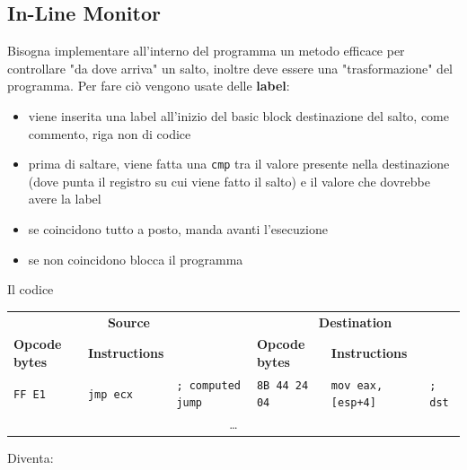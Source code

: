 \newpage

\subsection{In-Line Monitor}

Bisogna implementare all'interno del programma un metodo efficace per controllare "da dove arriva" un salto, inoltre deve essere una "trasformazione" del programma. Per fare ciò vengono usate delle \textbf{label}:
\begin{itemize}
	\item viene inserita una label all'inizio del basic block destinazione del salto, come commento, riga non di codice
	\item prima di saltare, viene fatta una \texttt{cmp} tra il valore presente nella destinazione (dove punta il registro su cui viene fatto il salto) e il valore che dovrebbe avere la label
	\item se coincidono tutto a posto, manda avanti l'esecuzione
	\item se non coincidono blocca il programma
\end{itemize} 

Il codice
\begin{table}[h]
	\centering
	\begin{adjustbox}{max width=\textwidth}
	\begin{tabular}{@{} lll | lll @{}}
		\multicolumn{3}{c}{\bfseries Source} & \multicolumn{3}{c}{\bfseries Destination} \\
		\cmidrule(lr){1-3} \cmidrule(l){4-6}
		\bfseries Opcode bytes & \bfseries Instructions &
		& \bfseries Opcode bytes & \bfseries Instructions & \\
		\midrule
		\texttt{FF E1} & \texttt{jmp ecx} & \texttt{; computed jump}
		& \texttt{8B 44 24 04} & \texttt{mov eax, [esp+4]} & \texttt{; dst} \\
		\multicolumn{6}{c}{\dots} \\
	\end{tabular}
	\end{adjustbox}
\end{table}

Diventa:

